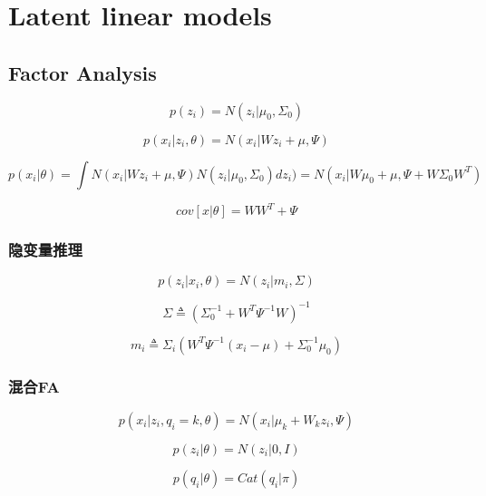 \chapter{Latent linear models}
\section{Factor Analysis}
\begin{equation}
p(z_i) = N(z_i|\mu_0, \Sigma_0)
\end{equation}

\begin{equation}
p(x_i|z_i,\theta) = N(x_i|Wz_i + \mu, \Psi)
\end{equation}

\begin{equation}
p(x_i|\theta) = 
\int N(x_i|Wz_i +\mu, \Psi)N(z_i|\mu_0, \Sigma_0)dz_i)
= N(x_i|W\mu_0 +\mu, \Psi + W\Sigma_0W^T)
\end{equation}

\begin{equation}
cov[x|\theta] = WW^T + \Psi
\end{equation}

\subsection{隐变量推理}
\begin{equation}
p(z_i|x_i, \theta) = N(z_i|m_i, \Sigma)
\end{equation}

\begin{equation}
\Sigma \triangleq (\Sigma_0^{-1} + W^T\Psi^{-1}W)^{-1}
\end{equation}

\begin{equation}
m_i \triangleq \Sigma_i(W^T\Psi^{-1}(x_i - \mu) + \Sigma_0^{-1}\mu_0) 
\end{equation}

\subsection{混合FA}
\begin{equation}
p(x_i|z_i, q_i = k, \theta) = N(x_i|\mu_k + W_kz_i, \Psi)
\end{equation}

\begin{equation}
p(z_i|\theta) = N(z_i|0, I)
\end{equation}

\begin{equation}
p(q_i|\theta) = Cat(q_i|\pi)
\end{equation}

